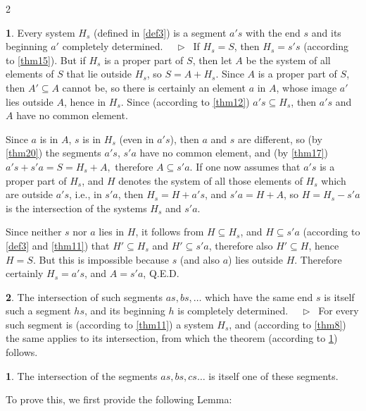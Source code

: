 \documentclass[leqno,hidelinks,10pt]{article}
\theoremstyle{definition}
\newtheorem{satz}{\protect\satzname}
\newtheorem*{zusatz}{\protect\zusatzname}
\newcommand{\satzname}{}
\newcommand{\zusatzname}{}
\renewcommand{\satzname}{\hspace{-4pt}.\ Satz}%
\renewcommand{\zusatzname}{Zusatz}%
\renewcommand{\satzname}{\hspace{-4pt}.\ Theorem}%
\renewcommand{\zusatzname}{Corollary}%
\newcommand\Beweis{\medskip \newline $ \phantom{'.'} \rhd \ $}%
\newcommand{\QED}{Q.E.D.}
\newcommand{\partof}{\subseteq}
\newcommand{\sref}[1]{\underline{\ref{#1}}}%
\begin{document}
\begin{paracol}{2}
\begin{rightcolumn}
\begin{satz}\label{thm27}
Every system $H_s$ (defined in \sref{def3}) is a segment $a's$ with the end $s$
and its beginning $a'$ completely determined.
\Beweis
If $H_s= S$, then $H_s= s's$ (according to \sref{thm15}).
But if $H_s$ is a proper part of $S$, then let $A$ be the system of all elements
of $S$ that lie outside $H_s$, so $S=A+H_s$. Since $A$ is a proper part of $S$,
then $A' \partof A$ cannot be, so there is certainly an element $a$ in $A$, whose
image $a'$ lies outside $A$, hence in $H_s$. Since (according to \sref{thm12})
$a's \partof H_s$, then $a's$ and $A$ have no common element.

Since $a$ is in $A$, $s$ is in $H_s$ (even in $a's$), then $a$ and $s$ are
different, so (by \sref{thm20}) the segments $a's$, $s'a$ have no common element,
and (by \sref{thm17}) $a's+  s'a=S=H_s+ A,$ therefore $A \partof s'a$.
If one now assumes that $a's$ is a proper part of $H_s$, and $H$ denotes the
system of all those elements of $H_s$ which are outside $a's$, i.e., in $s'a$,
then $H_s = H+a's$, and $s'a = H + A$, so $H=H_s-s'a$ is the intersection of the
systems $H_s$ and $s'a$.

Since neither $s$ nor $a$ lies in $H$, it follows from $H \partof H_s$, and
$H \partof s'a$ (according to \sref{def3} and \sref{thm11}) that $H' \partof H_s$
and $H' \partof s'a$, therefore also $H' \partof H$, hence $H = S$. But this is
impossible because $s$ (and also $a$) lies outside $H$. Therefore certainly
$H_s = a's$, and $A = s'a$, \QED
\end{satz}


\begin{satz}\label{thm28}
The intersection of such segments $as, bs, \ldots$ which have the same end $s$ is
itself such a segment $hs$, and its beginning $h$ is completely determined.
\Beweis
For every such segment is (according to \sref{thm11}) a system $H_s$, and
(according to \sref{thm8}) the same applies to its intersection, from which the
theorem (according to \sref{thm27}) follows.
\end{satz}

\begin{zusatz} \label{cor_to_thm28}
The intersection of the segments $as, bs, cs \ldots$ is itself one of these segments.
\end{zusatz}

To prove this, we first provide the following Lemma:


\end{rightcolumn}
\end{paracol}
\end{document}
